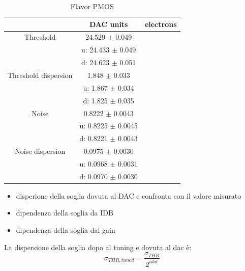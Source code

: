         \begin{table}
                \begin{center}
                \begin{tabular}{| c | c | c |}
                \hline
                 & DAC units & electrons \\
                \hline
                \hline
                Threshold        & 24.529 $\pm$ 0.049 & \\
                                 &u: 24.433 $\pm$ 0.049 & \\ 
                                 &d: 24.623 $\pm$ 0.051 &    \\      
                Threshold dispersion & 1.848 $\pm$ 0.033 &\\
                                 &u: 1.867 $\pm$ 0.034 & \\ 
                                 &d: 1.825 $\pm$ 0.035 &    \\ 
                Noise            & 0.8222 $\pm$ 0.0043 & \\
                                 &u: 0.8225 $\pm$ 0.0045 & \\ 
                                 &d: 0.8221 $\pm$ 0.0043 &    \\      
                Noise dispersion & 0.0975 $\pm$ 0.0030 &\\
                                 &u: 0.0968 $\pm$ 0.0031 & \\ 
                                 &d: 0.0970 $\pm$ 0.0030 &    \\ 
                \hline
                \end{tabular}
                \caption{Flavor PMOS}
                \label{tab:}
                \end{center}
        \end{table}        
    
    \begin{itemize}
        \item disperione della soglia dovuta al DAC e confronta con il valore misurato
        \item dipendenza della soglia da IDB
        \item dipendenza della soglia dal gain
    \end{itemize}    
    La dispersione della soglia dopo al tuning e dovuta al dac è: 
        \begin{equation}
            \sigma_{THR, tuned} = \frac{\sigma_{THR}}{2^{n bit}}
        \end{equation}
    
